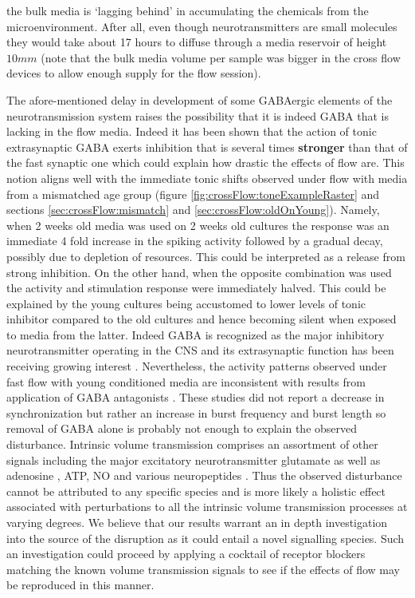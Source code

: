 the bulk media is `lagging behind' in accumulating the chemicals from the microenvironment. After all, even though neurotransmitters are small molecules they would take about 17 hours to diffuse through a media reservoir of height \(10 mm\) (note that the bulk media volume per sample was bigger in the cross flow devices to allow enough supply for the flow session).

The afore-mentioned delay in development of some GABAergic elements of the neurotransmission system raises the possibility that it is indeed GABA that is lacking in the flow media. Indeed it has been shown that the action of tonic extrasynaptic GABA exerts inhibition that is several times \textbf{stronger} than that of the fast synaptic one \cite{farrant2005variations,mody2004diversity} which could explain how drastic the effects of flow are. This notion aligns well with the immediate tonic shifts observed under flow with media from a mismatched age group (figure \ref{fig:crossFlow:toneExampleRaster} and sections \ref{sec:crossFlow:mismatch} and \ref{sec:crossFlow:oldOnYoung}). Namely, when 2 weeks old media was used on 2 weeks old cultures the response was an immediate 4 fold increase in the spiking activity followed by a gradual decay, possibly due to depletion of resources. This could be interpreted as a release from strong inhibition. On the other hand, when the opposite combination was used the activity and stimulation response were immediately halved. This could be explained by the young cultures being accustomed to lower levels of tonic inhibitor compared to the old cultures and hence becoming silent when exposed to media from the latter. Indeed GABA is recognized as the major inhibitory neurotransmitter operating in the CNS and its extrasynaptic function has been receiving growing interest \cite{mody2004diversity,lee2010channel,olah2009regulation}. Nevertheless, the activity patterns observed under fast flow with young conditioned media are inconsistent with results from application of GABA antagonists \cite{bikbaev2015brain,li2007long}. These studies did not report a decrease in synchronization but rather an increase in burst frequency and burst length so removal of GABA alone is probably not enough to explain the observed disturbance. Intrinsic volume transmission comprises an assortment of other signals including the major excitatory neurotransmitter glutamate \cite{cavelier2005tonic} as well as adenosine \cite{wall2015localized}, ATP, NO and various neuropeptides \cite{fuxe2010discovery,taber2014volume}. Thus the observed disturbance cannot be attributed to any specific species and is more likely a holistic effect associated with perturbations to all the intrinsic volume transmission processes at varying degrees. We believe that our results warrant an in depth investigation into the source of the disruption as it could entail a novel signalling species. Such an investigation could proceed by applying a cocktail of receptor blockers matching the known volume transmission signals to see if the effects of flow may be reproduced in this manner.

